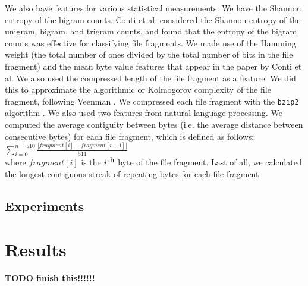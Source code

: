 \documentclass[letter,11pt]{article}
\begin{document}
We also have features for various statistical measurements. We have the Shannon entropy \cite{Shannon48} of the bigram counts. Conti et al. \cite{Conti10} considered the Shannon entropy of the unigram, bigram, and trigram counts, and found that the entropy of the bigram counts was effective for classifying file fragments. We made use of the Hamming weight (the total number of ones divided by the total number of bits in the file fragment) and the mean byte value features that appear in the paper by Conti et al. We also used the compressed length of the file fragment as a feature. We did this to approximate the algorithmic or Kolmogorov complexity of the file fragment, following Veenman \cite{Veenman07}. We compressed each file fragment with the \texttt{bzip2} algorithm \cite{Seward01}. We also used two features from natural language processing. We computed the average contiguity between bytes (i.e. the average distance between consecutive bytes) for each file fragment, which is defined as follows: \\

$\sum_{i=0}^{n=510}\frac{|fragment[i] - fragment[i+1]|}{511}$ \\

{\noindent}where $fragment[i]$ is the $i^\textrm{\small th}$ byte of the file fragment. Last of all, we calculated the longest contiguous streak of repeating bytes for each file fragment.

\subsection{Experiments}
\label{Subsection:Experiments}






\section{Results}
\label{Section:Results}
\textbf{TODO finish this!!!!!!}
\end{document}
